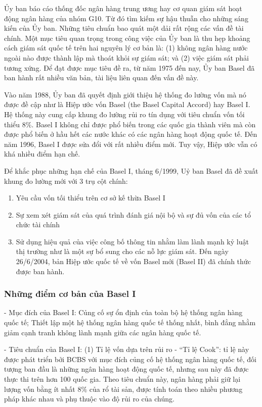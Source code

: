 Ủy ban báo cáo thống đốc ngân hàng trung ương hay cơ quan giám sát hoạt động ngân hàng của nhóm G10. Từ đó tìm kiếm sự hậu thuẫn cho những sáng kiến của Ủy ban. Những tiêu chuẩn bao quát một dải rất rộng các vấn đề tài chính. Một mục tiêu quan trọng trong công việc của Ủy ban là thu hẹp khoảng cách giám sát quốc tế trên hai nguyên lý cơ bản là: (1) không ngân hàng nước ngoài nào được thành lập mà thoát khỏi sự giám sát; và (2) việc giám sát phải tương xứng. Để đạt được mục tiêu đề ra, từ năm 1975 đến nay, Ủy ban Basel đã ban hành rất nhiều văn bản, tài liệu liên quan đến vấn đề này.

Vào năm 1988, Ủy ban đã quyết định giới thiệu hệ thống đo lường vốn mà nó được đề cập như là Hiệp ước vốn Basel (the Basel Capital Accord) hay Basel I. Hệ thống này cung cấp khung đo lường rủi ro tín dụng với tiêu chuẩn vốn tối thiểu $8\%$. Basel I không chỉ được phổ biến trong các quốc gia thành viên mà còn được phổ biến ở hầu hết các nước khác có các ngân hàng hoạt động quốc tế. Đến năm 1996, Basel I được sửa đổi với rất nhiều điểm mới. Tuy vậy, Hiệp ước vẫn có khá nhiều điểm hạn chế.

Để khắc phục những hạn chế của Basel I, tháng 6/1999, Uỷ ban Basel đã đề xuất khung đo lường mới với 3 trụ cột chính: 
\begin{enumerate}
\item Yêu cầu vốn tối thiểu trên cơ sở kế thừa Basel I 
\item Sự xem xét giám sát của quá trình đánh giá nội bộ và sự đủ vốn của các tổ chức tài chính
\item Sử dụng hiệu quả của việc công bố thông tin nhằm làm lành mạnh kỷ luật thị trường như là một sự bổ sung cho các nỗ lực giám sát. Đến ngày 26/6/2004, bản Hiệp ước quốc tế về vốn Basel mới (Basel II) đã chính thức được ban hành.
\end{enumerate}


\subsubsection{Những điểm cơ bản của Basel I}

- Mục đích của Basel I: Củng cố sự ổn định của toàn bộ hệ thống ngân hàng quốc tế;
Thiết lập một hệ thống ngân hàng quốc tế thống nhất, bình đẳng nhằm giảm cạnh tranh không lành mạnh giữa các ngân hàng quốc tế.

- Tiêu chuẩn của Basel I: (1) Tỉ lệ vốn dựa trên rủi ro - “Tỉ lệ Cook”: tỉ lệ này được phát triển bởi BCBS với mục đích củng cố hệ thống ngân hàng quốc tế, đối tượng ban đầu là những ngân hàng hoạt động quốc tế, nhưng sau này đã được thực thi trên hơn 100 quốc gia. Theo tiêu chuẩn này, ngân hàng phải giữ lại lượng vốn bằng ít nhất $8\%$ của rổ tài sản, được tính toán theo nhiều phương pháp khác nhau và phụ thuộc vào độ rủi ro của chúng.

